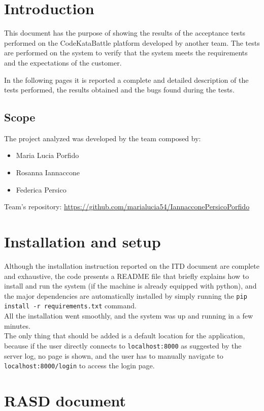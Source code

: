 \chapter{Introduction}

This document has the purpose of showing the results of the acceptance tests performed on the CodeKataBattle platform developed by another team. The tests are performed on the system to verify that the system meets the requirements and the expectations of the customer.

In the following pages it is reported a complete and detailed description of the tests performed, the results obtained and the bugs found during the tests.

\section{Scope}

The project analyzed was developed by the team composed by:
\begin{itemize}
    \item Maria Lucia Porfido
    \item Rosanna Iannaccone
    \item Federica Persico
\end{itemize}
Team's repository: \url{https://github.com/marialucia54/IannacconePersicoPorfido}

\chapter{Installation and setup}

Although the installation instruction reported on the ITD document are complete and exhaustive, the code presents a README file that briefly explains how to install and run the system (if the machine is already equipped with python), and the major dependencies are automatically installed by simply running the \texttt{pip install -r requirements.txt} command.\\

All the installation went smoothly, and the system was up and running in a few minutes.\\The only thing that should be added is a default location for the application, because if the user directly connects to \texttt{localhost:8000} as suggested by the server log, no page is shown, and the user has to manually navigate to \texttt{localhost:8000/login} to access the login page.

\chapter{RASD document}
